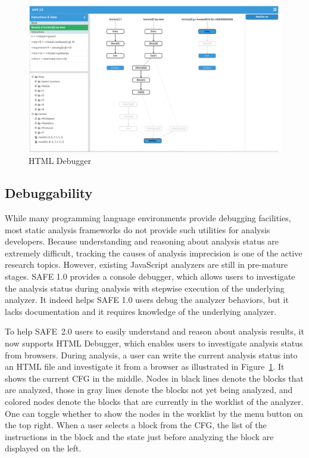 \documentclass[10pt, conference]{IEEEtran}
\newcommand{\oldsafe}{{SAFE 1.0}\xspace}
\newcommand{\safe}{{SAFE~2.0}\xspace}
\newcommand{\htmldebug}{{\sf\small HTML Debugger}\xspace}
\begin{document}
\begin{figure}[t]
\centering
\includegraphics[width=.7\textwidth]{htmldebugger.png}
\caption{\htmldebug}\label{fig:htmldebug}
\end{figure}

\subsection{Debuggability}
While many programming language environments provide debugging
facilities, most static analysis frameworks do not provide such utilities
for analysis developers.  Because understanding and reasoning about
analysis status are extremely difficult, tracking the causes of analysis
imprecision is one of the active research topics.  However, existing
JavaScript analyzers are still in pre-mature stages.  \oldsafe provides
a console debugger, which allows users to investigate the analysis status
during analysis with stepwise execution of the underlying analyzer.
It indeed helps \oldsafe users debug the analyzer behaviors, but it lacks
documentation and it requires knowledge of the underlying analyzer.


To help \safe users to easily understand and reason about
analysis results, it now supports \htmldebug, which enables users
to investigate analysis status from browsers.  During analysis,
a user can write the current analysis status into an HTML file and
investigate it from a browser as illustrated in
Figure~\ref{fig:htmldebug}.  It shows the current CFG in the middle.
Nodes in black lines denote the blocks that are analyzed, those in
gray lines denote the blocks not yet being analyzed, and colored nodes
denote the blocks that are currently in the worklist of the analyzer.
One can toggle whether to show the nodes in the worklist by the menu
button on the top right.
When a user selects a block from the CFG, the list of the instructions in
the block and the state just before analyzing the block are displayed
on the left.
\end{document}
